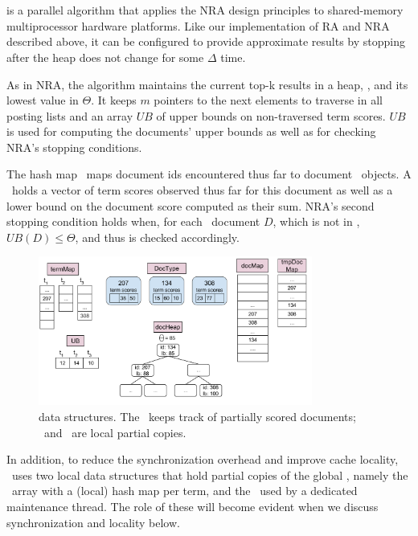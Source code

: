 \section{\alg\ }
\label{sec:alg}

\alg\/ is a parallel algorithm that applies the NRA design principles to shared-memory multiprocessor hardware platforms. 
Like our implementation of RA and NRA described above, 
it can be configured to provide approximate results by stopping after the heap does not change for some $\Delta$ time. 

As in NRA, the algorithm maintains the current top-k results in a heap, \DHeap, and its lowest value in $\Theta$. It keeps $m$ pointers to the next elements to traverse in all posting lists
and an array $UB$ of upper bounds on non-traversed term scores. 
$UB$ is used for computing the documents' upper bounds 
as well as for checking NRA's  stopping conditions.   

The hash map 
\DMap\ maps  document ids encountered thus far to document \Docobj\ objects. A \Docobj\ holds a vector of term scores observed thus far for this document as well as a lower bound on the document score computed as their sum.
NRA's second stopping condition holds when, for each \DMap\ document $D$, which is not in \DHeap, $UB(D) \le \Theta$, and thus is checked accordingly.






\begin{figure}[tbh]
\centering
\includegraphics[width=9cm]{figures/localData}
\caption{\alg\/ data structures. The \DMap\ keeps track of partially scored documents; \LDMap\ and \TMap\ are local partial copies.}
\label{fig:sparta_ds}
\end{figure}


In addition, to reduce the synchronization overhead and improve cache locality, \alg\ uses 
two local data structures that hold partial copies of the global \DMap, namely the \TMap\ array with a (local) hash map per term, 
and the \LDMap\ used by a dedicated maintenance thread. The role of these will become evident 
when we discuss synchronization and locality below.

